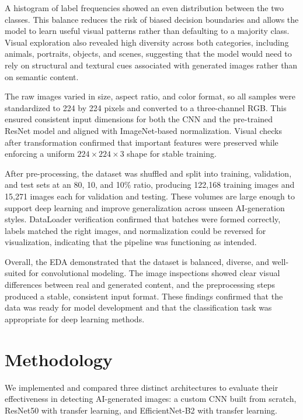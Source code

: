 \documentclass[man,12pt,letterpaper,donotrepeattitle,floatsintext]{apa7}
\begin{document}
A histogram of label frequencies showed an even distribution between the two classes. 
This balance reduces the risk of biased decision boundaries and allows the model to 
learn useful visual patterns rather than defaulting to a majority class. Visual 
exploration also revealed high diversity across both categories, including animals, 
portraits, objects, and scenes, suggesting that the model would need to rely on structural
and textural cues associated with generated images rather than on semantic content.

The raw images varied in size, aspect ratio, and color format, so all samples were 
standardized to 224 by 224 pixels and converted to a three-channel RGB. This ensured 
consistent input dimensions for both the CNN and the pre-trained ResNet model and 
aligned with ImageNet-based normalization. Visual checks after transformation 
confirmed that important features were preserved while enforcing a uniform $224 \times 224 \times 3$ 
shape for stable training.

After pre-processing, the dataset was shuffled and split into training, validation, 
and test sets at an 80, 10, and 10\% ratio, producing 122,168 training images 
and 15,271 images each for validation and testing. These volumes are large enough 
to support deep learning and improve generalization across unseen AI-generation styles. 
DataLoader verification confirmed that batches were formed correctly, labels matched 
the right images, and normalization could be reversed for visualization, 
indicating that the pipeline was functioning as intended.

Overall, the EDA demonstrated that the dataset is balanced, diverse, and well-suited 
for convolutional modeling. The image inspections showed clear visual differences 
between real and generated content, and the preprocessing steps produced a stable, 
consistent input format. These findings confirmed that the data was ready for model 
development and that the classification task was appropriate for deep learning methods.

\section{Methodology}
\label{methodology}

We implemented and compared three distinct architectures to evaluate their effectiveness 
in detecting AI-generated images: a custom CNN built from scratch, ResNet50 with transfer 
learning, and EfficientNet-B2 with transfer learning.
\end{document}
